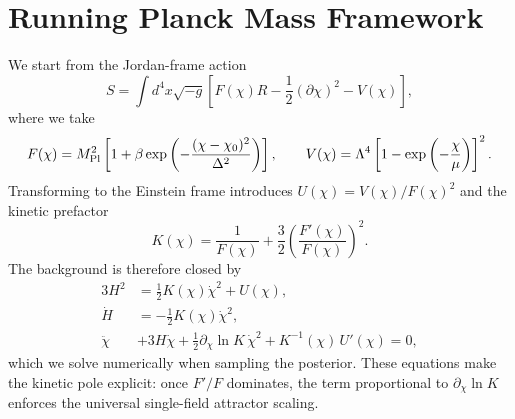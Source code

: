 \documentclass[11pt,a4paper]{article}
\begin{document}
\section{Running Planck Mass Framework}
\label{sec:framework}
We start from the Jordan-frame action
\begin{equation}
S=\int d^{4}x\sqrt{-g}\left[ F(\chi)R-\frac{1}{2}(\partial\chi)^2-V(\chi) \right],
\end{equation}
where we take
\begin{equation}
F(\chi)=M_{\rm Pl}^{2}\left[1+\beta\exp\left(-\frac{(\chi-\chi_{0})^{2}}{\Delta^{2}}\right)\right], \qquad V(\chi)=\Lambda^{4}\left[1-\exp\left(-\frac{\chi}{\mu}\right)\right]^{2}.
\end{equation}
Transforming to the Einstein frame introduces $U(\chi)=V(\chi)/F(\chi)^{2}$ and the kinetic prefactor
\begin{equation}
K(\chi)=\frac{1}{F(\chi)}+\frac{3}{2}\left(\frac{F'(\chi)}{F(\chi)}\right)^{2}.
\end{equation}
The background is therefore closed by
\begin{align}
3H^{2} &= \frac{1}{2}K(\chi)\dot{\chi}^{2}+U(\chi), \label{eq:friedmann}\\
\dot{H} &= -\frac{1}{2}K(\chi)\dot{\chi}^{2}, \label{eq:raychaudhuri}\\
\ddot{\chi} &+3H\dot{\chi}+\frac{1}{2}\partial_{\chi}\ln K\,\dot{\chi}^{2}+K^{-1}(\chi)\,U'(\chi)=0, \label{eq:field}
\end{align}
which we solve numerically when sampling the posterior. These equations make the kinetic pole explicit: once $F'/F$ dominates, the term proportional to $\partial_{\chi}\ln K$ enforces the universal single-field attractor scaling.
\end{document}
